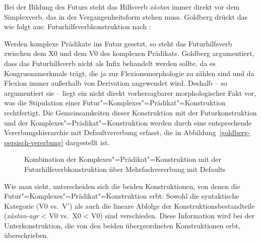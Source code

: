 Bei der Bildung des Futurs steht das Hilfsverb \emph{x{\^a}stan} immer direkt vor dem
Simplexverb, das in der Vergangenheitsform stehen muss. Goldberg drückt das wie folgt aus:
\eas
Futurhilfsverbkonstruktion nach :\\
\zs
Werden komplexe Prädikate ins Futur gesetzt, so steht das Futurhilfsverb zwischen dem X0
und dem V0 des komplexen Prädikats. Goldberg argumentiert, dass das Futurhilfsverb nicht als
Infix behandelt werden sollte, da es Kongruenzmerkmale trägt, die ja zur Flexionsmorphologie
zu zählen sind und da Flexion immer außerhalb von Derivation angewendet wird. Deshalb -- so argumentiert
sie -- liegt ein nicht direkt vorhersagbarer morphologischer Fakt vor, was die Stipulation einer
Futur"=Komplexes"=Prädikat"=Konstruktion rechtfertigt. 
Die Gemeinsamkeiten dieser Konstruktion
mit der Futurkonstruktion und der Komplexes"=Prädikat"=Konstruktion werden durch eine
entsprechende Vererbungshierarchie mit Defaultvererbung erfasst, die in Abbildung~\vref{goldberg-persisch-vererbung}
dargestellt ist.
\begin{figure}
\caption{\label{goldberg-persisch-vererbung}%
Kombination der Komplexes"=Prädikat"=Konstruktion mit der Futurhilfsverbkonstruktion über Mehrfachvererbung mit Defaults}
\end{figure}
Wie man sieht, unterscheiden sich die beiden Konstruktionen, von denen die Futur"=Komplexes"=Prädikat"=Konstruktion
erbt: Sowohl die syntaktische Kategorie (V0 vs.\ V$'$)
als auch die lineare Abfolge der Konstruktionsbestandteile (\emph{x{\^a}stan-agr}  <  V0 vs.\ X0  <  V0)
sind verschieden. Diese Information wird bei der Unterkonstruktion, die von den beiden übergeordneten
Konstruktionen erbt, überschrieben.

